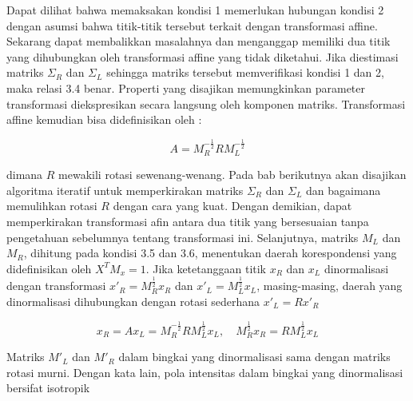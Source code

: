 Dapat dilihat bahwa memaksakan kondisi 1 memerlukan hubungan kondisi 2 dengan asumsi bahwa 
titik-titik tersebut terkait dengan transformasi affine. Sekarang dapat membalikkan masalahnya dan 
menganggap memiliki dua titik yang dihubungkan oleh transformasi affine yang tidak diketahui. 
Jika diestimasi matriks \(\Sigma_{R}\) dan \(\Sigma_{L}\) sehingga matriks tersebut memverifikasi 
kondisi 1 dan 2, maka relasi 3.4 benar. Properti yang disajikan memungkinkan parameter transformasi 
diekspresikan secara langsung oleh komponen matriks. Transformasi affine kemudian bisa didefinisikan oleh :

\begin{equation*}
  A = M_{R}^{-\frac{1}{2}}R M_{L}^{-\frac{1}{2}}
\end{equation*}

dimana \(R\) mewakili rotasi sewenang-wenang. Pada bab berikutnya akan disajikan algoritma iteratif untuk memperkirakan matriks \(\Sigma_{R}\) dan \(\Sigma_{L}\) dan 
bagaimana memulihkan rotasi \(R\) dengan cara yang kuat. Dengan demikian, dapat memperkirakan transformasi afin antara dua titik yang bersesuaian 
tanpa pengetahuan sebelumnya tentang transformasi ini. Selanjutnya, matriks \(M_{L}\) dan \(M_{R}\), dihitung pada kondisi 3.5 dan 3.6, menentukan daerah korespondensi 
yang didefinisikan oleh \(X^{T}M_{x}=1\). Jika ketetanggaan titik \(x_{R}\) dan \(x_{L}\) dinormalisasi dengan transformasi \(x'_{R}=M^{\frac{1}{2}}_{R}x_{R}\) dan \(x'_{L}=M^{\frac{1}{2}}_{L}x_{L}\), masing-masing, 
daerah yang dinormalisasi dihubungkan dengan rotasi sederhana \(x'_{L}=Rx'_{R}\)

\begin{equation}
  x_{R} = A x_{L} = M_{R}^{-\frac{1}{2}}R M_{L}^{\frac{1}{2}} x_{L}, \quad M_{R}^{\frac{1}{2}}x_{R} = R M_{L}^{\frac{1}{2}} x_{L}
\end{equation}

Matriks \(M'_{L}\) dan \(M'_{R}\) dalam bingkai yang dinormalisasi sama dengan matriks rotasi murni. Dengan kata lain, pola intensitas dalam bingkai yang dinormalisasi bersifat isotropik

